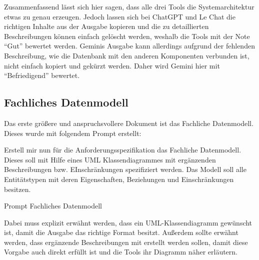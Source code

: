 Zusammenfassend lässt sich hier sagen, dass alle drei Tools die Systemarchitektur etwas zu genau erzeugen. Jedoch lassen sich bei ChatGPT 
und Le Chat die richtigen Inhalte aus der Ausgabe kopieren und die zu detaillierten Beschreibungen können einfach gelöscht werden, weshalb 
die Tools mit der Note ``Gut'' bewertet werden. Geminis Ausgabe kann allerdings aufgrund der fehlenden Beschreibung, wie die Datenbank mit 
den anderen Komponenten verbunden ist, nicht einfach kopiert und gekürzt werden. Daher wird Gemini hier mit ``Befriedigend'' bewertet.

\subsection*{Fachliches Datenmodell}

Das erste größere und anspruchsvollere Dokument ist das Fachliche Datenmodell. Dieses wurde mit folgendem Prompt erstellt:

\begin{prompt}[H]
    \begin{tcolorbox}[colback=gray!20, colframe=gray!20, boxrule=0pt, sharp corners] 
        Erstell mir nun für die Anforderungsspezifikation das Fachliche Datenmodell. Dieses soll mit Hilfe eines UML Klassendiagrammes mit ergänzenden Beschreibungen 
        bzw. EInschränkungen spezifiziert werden. Das Modell soll alle Entitätstypen mit deren Eigenschaften, Beziehungen und Einschränkungen besitzen.
        \vfill
    \end{tcolorbox}
    \caption{Prompt Fachliches Datenmodell}
    \label{Prompt Fachliches Datenmodell}
\end{prompt}

Dabei muss explizit erwähnt werden, dass ein UML-Klassendiagramm gewünscht ist, damit die Ausgabe das richtige Format besitzt. 
Außerdem sollte erwähnt werden, dass ergänzende Beschreibungen mit erstellt werden sollen, damit diese Vorgabe auch direkt erfüllt 
ist und die Tools ihr Diagramm näher erläutern.

